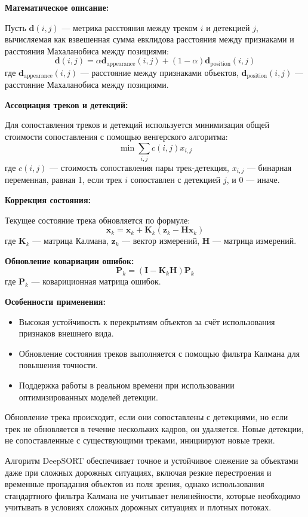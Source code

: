 \textbf{Математическое описание:}

Пусть $\mathbf{d}(i,j)$ — метрика расстояния между треком $i$ и детекцией $j$, вычисляемая как взвешенная сумма евклидова расстояния между признаками и расстояния Махаланобиса между позициями:
    \[ \mathbf{d}(i, j) = \alpha \mathbf{d}_{\text{appearance}}(i, j) + (1 - \alpha) \mathbf{d}_{\text{position}}(i, j) \]
где $\mathbf{d}_{\text{appearance}}(i, j)$ — расстояние между признаками объектов, $\mathbf{d}_{\text{position}}(i, j)$ — расстояние Махаланобиса между позициями.

\textbf{Ассоциация треков и детекций:}

Для сопоставления треков и детекций используется минимизация общей стоимости сопоставления с помощью венгерского алгоритма:
    \[ \min \sum_{i, j} c(i, j) x_{i,j} \]
где $c(i, j)$ — стоимость сопоставления пары трек-детекция, $x_{i,j}$ — бинарная переменная, равная 1, если трек $i$ сопоставлен с детекцией $j$, и 0 — иначе.

\textbf{Коррекция состояния:}

Текущее состояние трека обновляется по формуле:
    \[ \mathbf{x}_k = \mathbf{x}_k + \mathbf{K}_k (\mathbf{z}_k - \mathbf{H} \mathbf{x}_k) \]
    где $\mathbf{K}_k$ — матрица Калмана, $\mathbf{z}_k$ — вектор измерений, $\mathbf{H}$ — матрица измерений.

\textbf{Обновление ковариации ошибок:}
    \[ \mathbf{P}_k = (\mathbf{I} - \mathbf{K}_k \mathbf{H}) \mathbf{P}_k \]
где $\mathbf{P}_k$ — ковариционная матрица ошибок.


\textbf{Особенности применения:}
\begin{itemize}
    \item Высокая устойчивость к перекрытиям объектов за счёт использования признаков внешнего вида.
    \item Обновление состояния треков выполняется с помощью фильтра Калмана для повышения точности.
    \item Поддержка работы в реальном времени при использовании оптимизированных моделей детекции.
\end{itemize}

Обновление трека происходит, если они сопоставлены с детекциями, но если трек не обновляется в течение нескольких кадров, он удаляется. Новые детекции, не сопоставленные с существующими треками, инициируют новые треки.

Алгоритм DeepSORT обеспечивает точное и устойчивое слежение за объектами даже при сложных дорожных ситуациях, включая резкие перестроения и временные пропадания объектов из поля зрения, однако использования стандартного фильтра Калмана не учитывает нелинейности, которые необходимо учитывать в условиях сложных дорожных ситуациях и плотных потоках.


